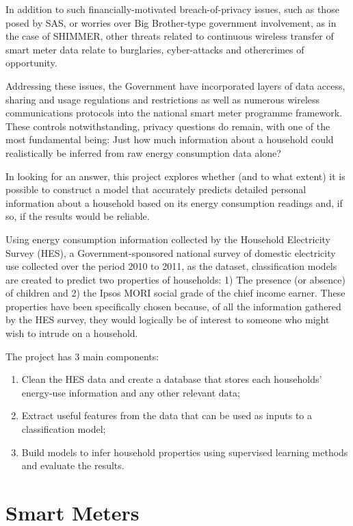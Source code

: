 In addition to such financially-motivated breach-of-privacy issues, such as those posed by SAS, or worries over Big Brother-type government involvement, as in the case of SHIMMER, other threats related to continuous wireless transfer of smart meter data relate to burglaries, cyber-attacks and othercrimes of opportunity. 

Addressing these issues, the Government have incorporated layers of data access, sharing and usage regulations and restrictions as well as numerous wireless communications protocols into the national smart meter programme framework.  These controls notwithstanding, privacy questions do remain, with one of the most fundamental being: Just how much information about a household could realistically be inferred from raw energy consumption data alone? 

In looking for an answer, this project explores whether (and to what extent) it is possible to construct a model that accurately predicts detailed personal information about a household based on its energy consumption readings and, if so, if the results would be reliable. 

Using energy consumption information collected by the Household Electricity Survey (HES), a Government-sponsored national survey of domestic electricity use collected over the period 2010 to 2011, as the dataset, classification models are created to predict two properties of households: 1) The presence (or absence) of children and 2) the Ipsos MORI social grade of the chief income earner. These properties have been specifically chosen because, of all the information gathered by the HES survey, they would logically be of interest to someone who might wish to intrude on a household.
\newline

The project has 3 main components:

\begin{enumerate}
\item Clean the HES data and create a database that stores each households' energy-use information and any other relevant data;
\item Extract useful features from the data that can be used as inputs to a classification model; 
\item Build models to infer household properties using supervised learning methods and evaluate the results.
\end{enumerate}


\section{Smart Meters}
